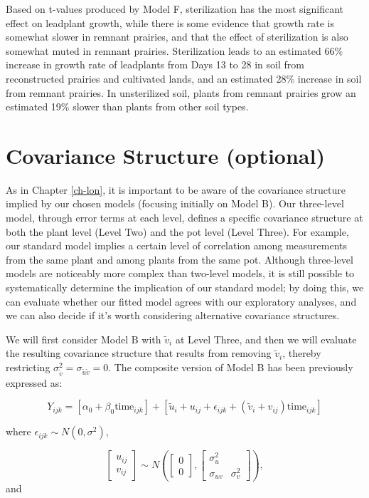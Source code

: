 \documentclass[
]{krantz}
\begin{document}
Based on t-values produced by Model F, sterilization has the most significant effect on leadplant growth, while there is some evidence that growth rate is somewhat slower in remnant prairies, and that the effect of sterilization is also somewhat muted in remnant prairies. Sterilization leads to an estimated 66\% increase in growth rate of leadplants from Days 13 to 28 in soil from reconstructed prairies and cultivated lands, and an estimated 28\% increase in soil from remnant prairies. In unsterilized soil, plants from remnant prairies grow an estimated 19\% slower than plants from other soil types.

\hypertarget{error-3level}{%
\section{Covariance Structure (optional)}\label{error-3level}}

As in Chapter \ref{ch-lon}, it is important to be aware of the covariance structure  implied by our chosen models (focusing initially on Model B). Our three-level model, through error terms at each level, defines a specific covariance structure at both the plant level (Level Two) and the pot level (Level Three). For example, our standard model implies a certain level of correlation among measurements from the same plant and among plants from the same pot. Although three-level models are noticeably more complex than two-level models, it is still possible to systematically determine the implication of our standard model; by doing this, we can evaluate whether our fitted model agrees with our exploratory analyses, and we can also decide if it's worth considering alternative covariance structures.

We will first consider Model B with \(\tilde{v}_{i}\) at Level Three, and then we will evaluate the resulting covariance structure that results from removing \(\tilde{v}_{i}\), thereby restricting \(\sigma_{\tilde{v}}^{2}=\sigma_{\tilde{u}\tilde{v}}=0\). The composite version of Model B has been previously expressed as:

\begin{equation*}
Y_{ijk}=[\alpha_{0}+\beta_{0}\textrm{time}_{ijk}]+
[\tilde{u}_{i}+u_{ij}+\epsilon_{ijk}+(\tilde{v}_{i}+v_{ij})\textrm{time}_{ijk}]
\end{equation*}

where \(\epsilon_{ijk}\sim N(0,\sigma^2)\),

\[ \left[ \begin{array}{c}
            u_{ij} \\ v_{ij}
          \end{array}  \right] \sim N \left( \left[
          \begin{array}{c}
            0 \\ 0
          \end{array} \right], \left[
          \begin{array}{cc}
            \sigma_{u}^{2} & \\
            \sigma_{uv} & \sigma_{v}^{2}
          \end{array} \right] \right), \] and
\end{document}
